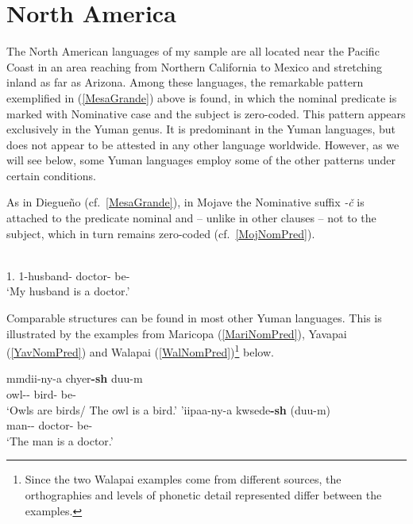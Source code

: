 
\section{North America}\label{NomPredNA}

The North American languages of my sample are all located near the Pacific Coast in an area reaching from Northern California to Mexico and stretching inland as far as Arizona. 
Among these languages, the remarkable pattern exemplified in (\ref{MesaGrande}) above is found, in which the nominal predicate is marked with Nominative case and the subject is zero-coded. 
This pattern appears exclusively in the Yuman genus. 
It is predominant in the Yuman languages, but does not appear to be attested in any other language worldwide. 
However, as we will see below, some Yuman languages employ some of the other patterns under certain conditions.

As in Diegue\~no (cf.~\ref{MesaGrande}), in Mojave the Nominative suffix \emph{-\v c} is attached to the predicate nominal and -- unlike in other clauses -- not to the subject, which in turn remains zero-coded (cf.~\ref{MojNomPred}).

\begin{exe}\ex\label{MojNomPred}
 \gll {}   \\
1\sg{}.\poss{} 1-husband-\dem{} doctor-\nom{} be-\tns{}\\
\glt `My husband is a doctor.' 
\end{exe}

Comparable structures can be found in most other Yuman languages. This is illustrated by the examples from Maricopa (\ref{MariNomPred}), Yavapai (\ref{YavNomPred}) and Walapai (\ref{WalNomPred})\footnote{Since the two Walapai examples come from different sources, the orthographies and levels of phonetic detail represented differ between the examples.} below.

\begin{exe}
\ex\label{MariNomPred}
\begin{xlist}\ex\gll mmdii-ny-a chyer\textbf{-sh} duu-m\\
owl-\dem{}-\augv{} bird-\nom{} be-\rls{}\\
\glt `Owls are birds/ The owl is a bird.' 
\ex\gll 'iipaa-ny-a kwsede\textbf{-sh} (duu-m)\\
man-\dem{}-\augv{} doctor-\nom{} be-\rls{}\\
\glt `The man is a doctor.'
\end{xlist}
\end{exe}

